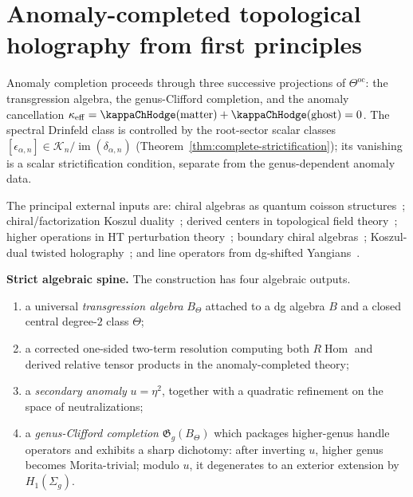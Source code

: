 
\section{Anomaly-completed topological holography from first principles}
\label{app:anomaly-completed-topological-holography}


Anomaly completion proceeds through three successive projections of
$\Theta^{\mathrm{oc}}$: the transgression algebra, the genus-Clifford
completion, and the anomaly cancellation
$\kappa_{\mathrm{eff}} = \kappaChHodge(\text{matter}) + \kappaChHodge(\text{ghost}) = 0$.
The spectral Drinfeld class is controlled by the root-sector scalar
classes
$[\epsilon_{\alpha,n}]\in
\mathscr K_n/\operatorname{im}(\delta_{\alpha,n})$
(Theorem~\ref{thm:complete-strictification}); its vanishing is a
scalar strictification condition, separate from the genus-dependent
anomaly data.

The principal external inputs are:
chiral algebras as quantum coisson structures~\cite{BD04};
chiral/factorization Koszul duality~\cite{FG12};
derived centers in topological field theory~\cite{costello-gaiotto,CP2020,DNP25};
higher operations in HT perturbation theory~\cite{GKW24};
boundary chiral algebras~\cite{CDG20};
Koszul-dual twisted holography~\cite{Zeng23};
and line operators from dg-shifted Yangians~\cite{DNP25}.

\medskip

\noindent\textbf{Strict algebraic spine.}
The construction has four algebraic outputs.
\begin{enumerate}
\item a universal \emph{transgression algebra} \(B_{\Theta}\) attached to a dg algebra \(B\) and a closed central degree-\(2\) class \(\Theta\);
\item a corrected one-sided two-term resolution computing both \(R\!\operatorname{Hom}\) and derived relative tensor products in the anomaly-completed theory;
\item a \emph{secondary anomaly} \(u=\eta^{2}\), together with a quadratic refinement on the space of neutralizations;
\item a \emph{genus-Clifford completion} \(\mathfrak{G}_{g}(B_{\Theta})\) which packages higher-genus handle operators and exhibits a sharp dichotomy:
after inverting \(u\), higher genus becomes Morita-trivial; modulo \(u\), it degenerates to an exterior extension by \(H_{1}(\Sigma_{g})\).
\end{enumerate}

